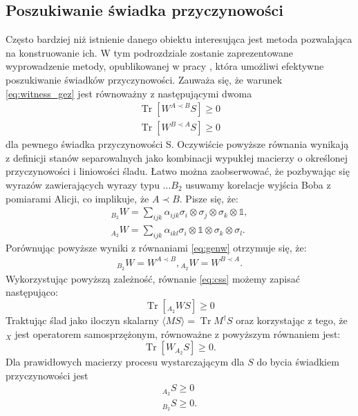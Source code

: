 \documentclass[10pt]{article} %
\DeclareMathOperator{\Trs}{Tr}
\newcommand{\I}{\mathbb{1}}
\begin{document}
\subsection{Poszukiwanie świadka przyczynowości}
Często bardziej niż istnienie danego obiektu interesująca jest metoda pozwalająca na konstruowanie ich. W tym podrozdziale zostanie zaprezentowane wyprowadzenie metody, opublikowanej w pracy \cite{causal_witness}, która umożliwi efektywne poszukiwanie świadków przyczynowości.
Zauważa się, że warunek \eqref{eq:witness_gez} jest równoważny z następującymi dwoma
\begin{gather}
\label{eq:css2}
\Trs \left[ W^{A \prec B} S\right] \geq 0 \\
\label{eq:css}
\Trs \left[ W^{B \prec A} S\right] \geq 0
\end{gather}
dla pewnego świadka przyczynowości S.
Oczywiście powyższe równania wynikają z definicji stanów separowalnych jako kombinacji wypukłej macierzy o określonej przyczynowości i liniowości śladu.
Łatwo można zaobserwować, że pozbywając się wyrazów zawierających wyrazy typu $\dots B_2$ usuwamy korelacje wyjścia Boba z pomiarami Alicji, co
implikuje, że $A \prec B$. Pisze się, że:
\begin{gather}
{}_{B_2} W = \sum_{ijk} \alpha_{ijk} \sigma_i \otimes \sigma_j \otimes \sigma_k \otimes \I,\\
{}_{A_2} W = \sum_{ijk} \alpha_{ikl} \sigma_i \otimes \I \otimes \sigma_k \otimes \sigma_l.
\end{gather}
Porównując powyższe wyniki z równaniami \ref{eq:genw} otrzymuje się, że:
\begin{gather}
{}_{B_2} W = W^{A \prec B},
{}_{A_2} W = W^{B \prec A}.
\end{gather}
Wykorzystując powyższą zależność, równanie \eqref{eq:css} możemy zapisać następująco:
\begin{equation}
\Trs \left[ {}_{A_2} W S\right] \geq 0
\end{equation}
Traktując ślad jako iloczyn skalarny $\langle M S \rangle = \Trs M^\dag S$ oraz korzystając z tego, że ${}_X$ jest operatorem samosprzężonym, równoważne z powyższym
równaniem jest:
\begin{equation}
\Trs \left[ W {}_{A_2}S \right] \geq 0.
\end{equation}
Dla prawidłowych macierzy procesu wystarczającym dla $S$ do bycia świadkiem przyczynowości jest 
\begin{gather}
{}_{A_2} S \geq 0 \\
{}_{B_2} S \geq 0.
\end{gather}
\end{document}

